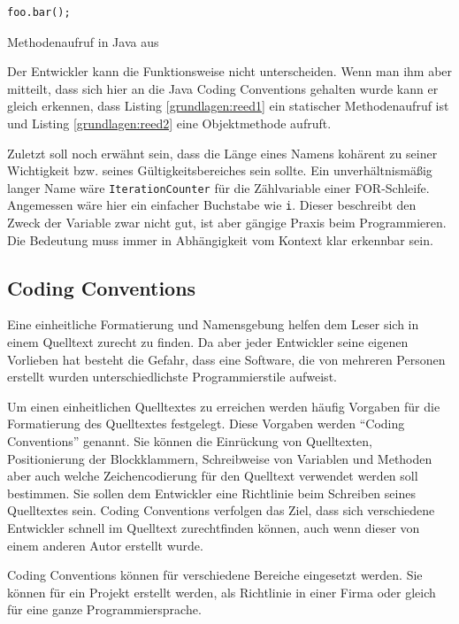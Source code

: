 \begin{listing}
    \begin{verbatim}
foo.bar();
    \end{verbatim}
    \caption{Methodenaufruf in Java aus \cite[S. 182]{reed}}
    \label{grundlagen:reed2}
\end{listing}

Der Entwickler kann die Funktionsweise nicht unterscheiden.
Wenn man ihm aber mitteilt, dass sich hier an die Java Coding Conventions gehalten wurde kann er gleich erkennen,
dass Listing \ref{grundlagen:reed1} ein statischer Methodenaufruf ist und
Listing \ref{grundlagen:reed2} eine Objektmethode aufruft.

Zuletzt soll noch erwähnt sein, dass die Länge eines Namens kohärent zu seiner Wichtigkeit bzw. seines Gültigkeitsbereiches sein sollte.
Ein unverhältnismäßig langer Name wäre \texttt{IterationCounter} für die Zählvariable einer FOR-Schleife. Angemessen wäre hier ein einfacher Buchstabe wie \texttt{i}. Dieser beschreibt den Zweck der Variable zwar nicht gut, ist aber gängige Praxis beim Programmieren. Die Bedeutung muss immer in Abhängigkeit vom Kontext klar erkennbar sein.



\subsection{Coding Conventions}

Eine einheitliche Formatierung und Namensgebung helfen dem Leser sich in einem Quelltext zurecht zu finden. Da aber jeder Entwickler seine eigenen Vorlieben hat besteht die Gefahr, dass eine Software, die von mehreren Personen erstellt wurden unterschiedlichste Programmierstile aufweist. 

Um einen einheitlichen Quelltextes zu erreichen werden häufig Vorgaben für die Formatierung des Quelltextes festgelegt. Diese Vorgaben werden \enquote{Coding Conventions} genannt. Sie können die Einrückung von Quelltexten,
Positionierung der Blockklammern, Schreibweise von Variablen und Methoden aber auch
welche Zeichencodierung für den Quelltext verwendet werden soll bestimmen. Sie sollen dem Entwickler eine Richtlinie beim Schreiben seines Quelltextes sein. Coding Conventions verfolgen das Ziel, dass sich verschiedene Entwickler schnell im Quelltext zurechtfinden können, auch wenn dieser von einem anderen Autor erstellt wurde.

Coding Conventions können für verschiedene Bereiche eingesetzt werden. Sie können für
ein Projekt erstellt werden, als Richtlinie in einer Firma oder gleich für eine ganze Programmiersprache.

